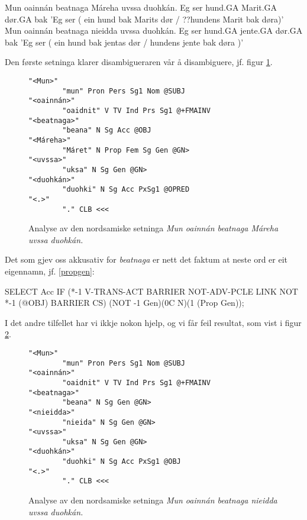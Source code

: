 \documentclass[a4paper,nynorsk]{article}
\begin{document}
\begin{example}\label{hund}
\gll Mun oainnán beatnaga Máreha uvssa duohkán.
 Eg ser hund.GA Marit.GA dør.GA bak
\glt 'Eg ser ( ein hund bak Marits dør / ??hundens Marit bak døra)'
\glend
\gll Mun oainnán beatnaga nieidda uvssa duohkán.
  Eg ser hund.GA jente.GA dør.GA bak
\glt 'Eg ser ( ein hund bak jentas dør / hundens jente bak døra )'
\glend
\end{example}

Den første setninga klarer disambigueraren vår å disambiguere, jf. figur \ref{Mareha}. %

\begin{figure}[htbp]
\begin{center}
\begin{verbatim}
"<Mun>"
        "mun" Pron Pers Sg1 Nom @SUBJ
"<oainnán>"
        "oaidnit" V TV Ind Prs Sg1 @+FMAINV
"<beatnaga>"
        "beana" N Sg Acc @OBJ
"<Máreha>"
        "Máret" N Prop Fem Sg Gen @GN>
"<uvssa>"
        "uksa" N Sg Gen @GN>
"<duohkán>"
        "duohki" N Sg Acc PxSg1 @OPRED
"<.>"
        "." CLB <<<
\end{verbatim}
\caption{Analyse av den nordsamiske setninga \textit{Mun oainnán beatnaga Máreha uvssa duohkán.}}
\label{Mareha}
\end{center}
\end{figure}


Det som gjev oss akkusativ for \textit{beatnaga} er nett det faktum at neste ord er eit eigennamn, jf. \ref{propgen}: %

\begin{example}\label{propgen}
SELECT Acc IF (*-1 V-TRANS-ACT BARRIER NOT-ADV-PCLE LINK NOT *-1 (@OBJ) BARRIER CS)
	(NOT -1 Gen)(0C N)(1 (Prop Gen));
\end{example}

I det andre tilfellet har vi ikkje nokon hjelp, og vi får feil resultat, som vist i figur \ref{beatnaga}. %


\begin{figure}[htbp]
\begin{center}
\begin{verbatim}
"<Mun>"
        "mun" Pron Pers Sg1 Nom @SUBJ
"<oainnán>"
        "oaidnit" V TV Ind Prs Sg1 @+FMAINV
"<beatnaga>"
        "beana" N Sg Gen @GN>
"<nieidda>"
        "nieida" N Sg Gen @GN>
"<uvssa>"
        "uksa" N Sg Gen @GN>
"<duohkán>"
        "duohki" N Sg Acc PxSg1 @OBJ
"<.>"
        "." CLB <<<
\end{verbatim}
\caption{Analyse av den nordsamiske setninga \textit{Mun oainnán beatnaga nieidda uvssa duohkán.}}
\label{beatnaga}
\end{center}
\end{figure}
\end{document}
